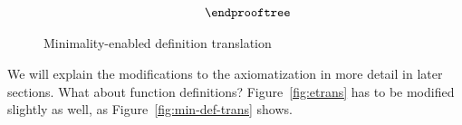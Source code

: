\documentclass[preprint,nocopyrightspace,draft]{sigplanconf}
\begin{document}
\begin{figure}
\[\begin{array}{c}
{\begin{array}{l}
{\begin{array}{l}
\begin{array}{ll}
                   \end{array}
     \end{array}}
  \end{array}}
\endprooftree
\end{array}\]
\caption{Minimality-enabled definition translation}\label{fig:min-def-trans-min}
\end{figure}



We will explain the modifications to the axiomatization in more detail in later sections.
What about function definitions? Figure~\ref{fig:etrans} has to be modified slightly as well, 
as Figure~\ref{fig:min-def-trans} shows.
\end{document}
